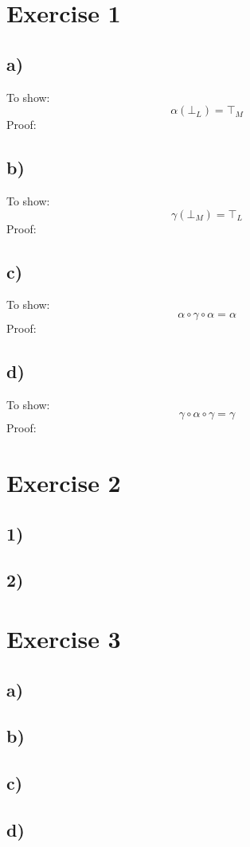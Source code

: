 \documentclass[fleqn,12pt]{article}
\begin{document}
\section*{Exercise 1}
\subsection*{a)}
To show:
$$\alpha(\bot_L) = \top_M$$
Proof:
\subsection*{b)}
To show:
$$\gamma(\bot_M) = \top_L$$
Proof:

\subsection*{c)}
To show:
$$\alpha \circ \gamma \circ \alpha = \alpha$$
Proof:

\subsection*{d)}
To show:
$$\gamma \circ \alpha \circ \gamma = \gamma$$
Proof:

\section*{Exercise 2}

\subsection*{1)}

\subsection*{2)}

\section*{Exercise 3}
\subsection*{a)}

\subsection*{b)}

\subsection*{c)}

\subsection*{d)}
\end{document}
